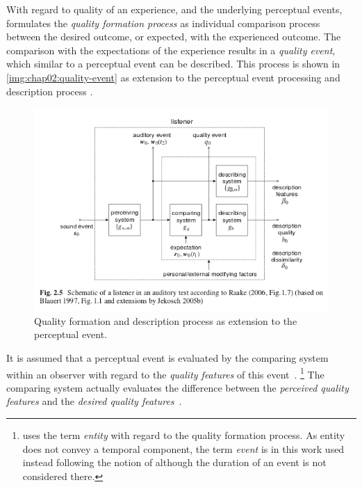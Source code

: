 With regard to quality of an experience, and the underlying perceptual events, \cite{jekosch_voice_2005} formulates the \emph{quality formation process} as individual comparison process between the desired outcome, or expected, with the experienced outcome.
The comparison with the expectations of the experience results in a \emph{quality event}, which similar to a perceptual event can be described.
This process is shown in \autoref{img:chap02:quality-event} as extension to the perceptual event processing and description process .
\begin{figure}
	\includegraphics[width=1\textwidth]{fig/quality-event}
	\caption{Quality formation and description process as extension to the perceptual event.}
	\label{img:chap02:quality-event}
\end{figure}

It is assumed that a perceptual event is evaluated by the comparing system within an observer with regard to the \emph{quality features} of this event~\cite[cf. p. 17]{jekosch_voice_2005}.
\footnote{\cite{jekosch_voice_2005} uses the term \emph{entity} with regard to the quality formation process.
As entity does not convey a temporal component, the term \emph{event} is in this work used instead following the notion of \cite{blauert_spatial_1996} although the duration of an event is not considered there.}
The comparing system actually evaluates the difference between the \emph{perceived quality features} and the \emph{desired quality features}~\cite[p. 23]{raake_book}.

